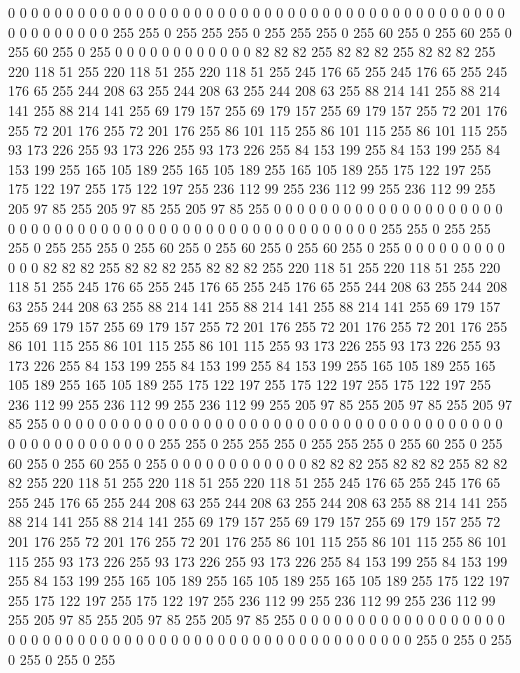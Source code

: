 0 0 0 0 0 0 0 0 0 0 0 0 0 0 0 0 0 0 0 0 0 0 0 0 0 0 0 0 0 0 0 0 0 0 0 0 0 0 0 0 0 0 0 0 0 0 0 0 0 0 0 0 255 255 0 255 255 255 0 255 255 255 0 255
60 255 0 255 60 255 0 255 60 255 0 255 0 0 0 0 0 0 0 0 0 0 0 0 82 82 82 255 82 82 82 255 82 82 82 255 220 118 51 255 220 118 51 255 220 118 51 255 245 176 65 255 245 176 65 255 245 176 65 255 244 208 63 255
244 208 63 255 244 208 63 255 88 214 141 255 88 214 141 255 88 214 141 255 69 179 157 255 69 179 157 255 69 179 157 255 72 201 176 255 72 201 176 255 72 201 176 255 86 101 115 255 86 101 115 255 86 101 115 255 93 173 226 255 93 173 226 255
93 173 226 255 84 153 199 255 84 153 199 255 84 153 199 255 165 105 189 255 165 105 189 255 165 105 189 255 175 122 197 255 175 122 197 255 175 122 197 255 236 112 99 255 236 112 99 255 236 112 99 255 205 97 85 255 205 97 85 255 205 97 85 255
0 0 0 0 0 0 0 0 0 0 0 0 0 0 0 0 0 0 0 0 0 0 0 0 0 0 0 0 0 0 0 0 0 0 0 0 0 0 0 0 0 0 0 0 0 0 0 0 0 0 0 0 255 255 0 255 255 255 0 255 255 255 0 255
60 255 0 255 60 255 0 255 60 255 0 255 0 0 0 0 0 0 0 0 0 0 0 0 82 82 82 255 82 82 82 255 82 82 82 255 220 118 51 255 220 118 51 255 220 118 51 255 245 176 65 255 245 176 65 255 245 176 65 255 244 208 63 255
244 208 63 255 244 208 63 255 88 214 141 255 88 214 141 255 88 214 141 255 69 179 157 255 69 179 157 255 69 179 157 255 72 201 176 255 72 201 176 255 72 201 176 255 86 101 115 255 86 101 115 255 86 101 115 255 93 173 226 255 93 173 226 255
93 173 226 255 84 153 199 255 84 153 199 255 84 153 199 255 165 105 189 255 165 105 189 255 165 105 189 255 175 122 197 255 175 122 197 255 175 122 197 255 236 112 99 255 236 112 99 255 236 112 99 255 205 97 85 255 205 97 85 255 205 97 85 255
0 0 0 0 0 0 0 0 0 0 0 0 0 0 0 0 0 0 0 0 0 0 0 0 0 0 0 0 0 0 0 0 0 0 0 0 0 0 0 0 0 0 0 0 0 0 0 0 0 0 0 0 255 255 0 255 255 255 0 255 255 255 0 255
60 255 0 255 60 255 0 255 60 255 0 255 0 0 0 0 0 0 0 0 0 0 0 0 82 82 82 255 82 82 82 255 82 82 82 255 220 118 51 255 220 118 51 255 220 118 51 255 245 176 65 255 245 176 65 255 245 176 65 255 244 208 63 255
244 208 63 255 244 208 63 255 88 214 141 255 88 214 141 255 88 214 141 255 69 179 157 255 69 179 157 255 69 179 157 255 72 201 176 255 72 201 176 255 72 201 176 255 86 101 115 255 86 101 115 255 86 101 115 255 93 173 226 255 93 173 226 255
93 173 226 255 84 153 199 255 84 153 199 255 84 153 199 255 165 105 189 255 165 105 189 255 165 105 189 255 175 122 197 255 175 122 197 255 175 122 197 255 236 112 99 255 236 112 99 255 236 112 99 255 205 97 85 255 205 97 85 255 205 97 85 255
0 0 0 0 0 0 0 0 0 0 0 0 0 0 0 0 0 0 0 0 0 0 0 0 0 0 0 0 0 0 0 0 0 0 0 0 0 0 0 0 0 0 0 0 0 0 0 0 0 0 0 0 0 255 0 255 0 255 0 255 0 255 0 255
